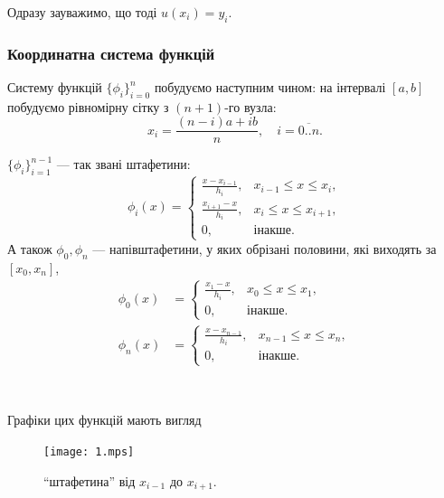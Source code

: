 Одразу зауважимо, що тоді $u(x_i) = y_i$.

\subsubsection{Координатна система функцій}

Систему функцій $\{\phi_i\}_{i = 0}^n$ побудуємо наступним чином: на інтервалі $[a, b]$ побудуємо рівномірну сітку з $(n + 1)$-го вузла:
\begin{equation}
    \label{eq:2.1.3}
    x_i = \frac{(n - i) a + i b}{n}, \quad i = \overline{0..n}.
\end{equation}

\begin{minipage}[t]{.475\textwidth}
    \begin{example*}
    $\{\phi_i\}_{i = 1}^{n - 1}$ --- так звані штафетини:
        \begin{equation}
        \label{eq:2.1.4}
            \phi_i(x) = \begin{cases}
                \frac{x - x_{i - 1}}{h_i}, & x_{i - 1} \le x \le x_i, \\[.5ex]
                \frac{x_{i + 1} - x}{h_i}, & x_i \le x \le x_{i + 1}, \\
                0, & \text{інакше}.
            \end{cases}
        \end{equation}
        А також $\phi_0, \phi_n$ --- напівштафетини, у яких обрізані половини, які виходять за $[x_0, x_n]$,
        \begin{align}
            \phi_0(x) &= \begin{cases}
                \frac{x_1 - x}{h_i}, & x_0 \le x \le x_1, \\
                0, & \text{інакше}.
            \end{cases} \\
            \phi_n(x) &= \begin{cases}
                \frac{x - x_{n - 1}}{h_i}, & x_{n - 1} \le x \le x_n, \\
                0, & \text{інакше}.
            \end{cases}
        \end{align}
    \end{example*}
\end{minipage}
\begin{minipage}[t]{.05\textwidth}
    $\left.\right.$
\end{minipage}
\begin{minipage}[t]{.475\textwidth}
    Графіки цих функцій мають вигляд
    \begin{figure}[H]
        \centering
        \texttt{[image: 1.mps]} %
        \caption{``штафетина'' від $x_{i - 1}$ до $x_{i + 1}$.}
    \end{figure}
\end{minipage} \medskip

